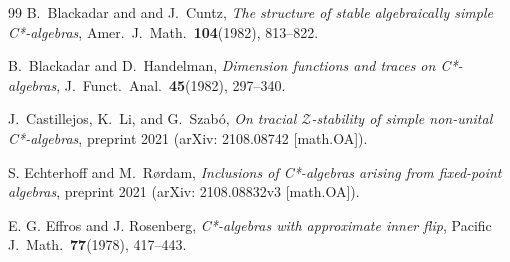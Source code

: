 \documentclass[11pt]{amsart}
\theoremstyle{plain}
\theoremstyle{definition}
\theoremstyle{remark}
\numberwithin{equation}{section}
\begin{document}
\begin{thebibliography}{99}
B.~Blackadar and and J.~Cuntz,
\emph{The structure of stable algebraically simple C*-algebras},
Amer.\  J.\  Math.\  {\textbf{104}}(1982), 813--822.

 B.~Blackadar and D.~Handelman,
{\emph{Dimension functions and traces on C*-algebras}},
J.~Funct.\  Anal.\  {\textbf{45}}(1982), 297--340.









J.\ Castillejos, K.\ Li, and G.\ Szab\'{o},
\emph{On tracial $\mathcal{Z}$-stability of simple 
non-unital C*-algebras},
preprint 2021 (arXiv: 2108.08742 [math.OA]).

S. Echterhoff and M.~R{\o}rdam,
\emph{Inclusions of C*-algebras arising from fixed-point algebras},
preprint 2021 (arXiv:  2108.08832v3 [math.OA]).

E. G. Effros and J. Rosenberg,
\emph{C*-algebras with approximate inner flip},
Pacific J.\  Math.\  {\textbf{77}}(1978), 417--443.




\end{thebibliography}
\end{document}
